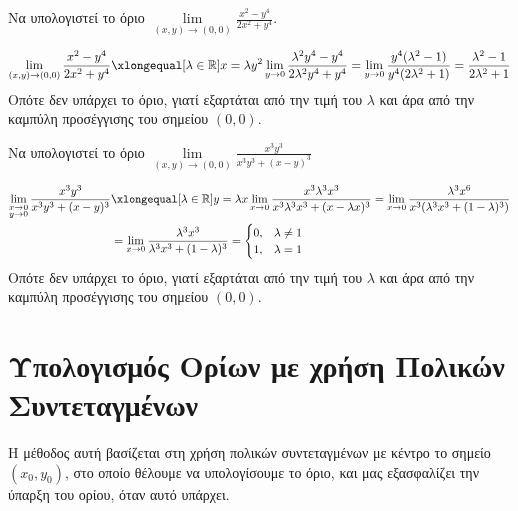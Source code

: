 \begin{example}
  Να υπολογιστεί το όριο $ \lim\limits_{(x,y)\to (0, 0)} \frac{x^{2}-y^{4}}
  {2x^{2}+y^{4}} $. 
  \begin{solution}
    \[
      \lim\limits_{(x,y)\to (0, 0)} \frac{x^{2}-y^{4}}
      {2x^{2}+y^{4}} \xlongequal[\lambda \in \mathbb{R}]
      {x= \lambda y^{2}} \lim_{y \to 0} 
      \frac{\lambda ^{2}y^{4}-y^{4}}{2 \lambda ^{2}y^{4}+y^{4}} = 
      \lim_{y \to 0} \frac{y^{4}(\lambda ^{2}-1)}
      {y^{4}(2 \lambda ^{2}+1)} = 
      \frac{\lambda ^{2}-1}{2 \lambda ^{2}+1} 
    \] 
    Οπότε δεν υπάρχει το όριο, γιατί εξαρτάται από την τιμή του $ \lambda $ 
    και άρα από την καμπύλη προσέγγισης του σημείου $ (0,0) $.
  \end{solution}
\end{example}

\begin{example}
  Να υπολογιστεί το όριο 
  $ \lim\limits_{(x,y)\to (0, 0)} \frac{x^{3}y^{3}}{x^{3}y^{3}+ (x-y)^{3}} $ 
  \begin{solution}
  \item {}
    \begin{align*}
      \lim\limits_{\substack{x \to 0\\ y \to 0}} \frac{x^{3}y^{3}}{x^{3}y^{3} + 
      (x-y)^{3}} 
    &\xlongequal[\lambda \in \mathbb{R}]{y = \lambda x} \lim_{x \to 0} \frac{x^{3} 
    \lambda ^{3} x^{3}}{x^{3} \lambda ^{3} x^{3} + (x - \lambda x)^{3}} 
    = \lim_{x \to 0} \frac{\lambda ^{3}x^{6}}{x^{3} 
    (\lambda ^{3} x^{3} + (1- \lambda)^{3})} \\
    &= \lim_{x \to 0} \frac{\lambda ^{3} x^{3}}{\lambda ^{3}x^{3} + (1- \lambda)^{3}} 
    = 
    \begin{cases} 
      0, & \lambda \neq 1 \\ 
      1, & \lambda = 1 
    \end{cases} 
    \end{align*} 
    Οπότε δεν υπάρχει το όριο, γιατί εξαρτάται από την τιμή του 
    $ \lambda $ και άρα από την καμπύλη προσέγγισης του σημείου 
    $ (0,0) $.
  \end{solution}
\end{example}


\section{Υπολογισμός Ορίων με χρήση Πολικών Συντεταγμένων}

Η μέθοδος αυτή βασίζεται στη χρήση πολικών συντεταγμένων με κέντρο το σημείο 
$ (x_{0}, y_{0}) $, στο οποίο θέλουμε να υπολογίσουμε το όριο, και μας εξασφαλίζει 
την ύπαρξη του ορίου, όταν αυτό υπάρχει.

